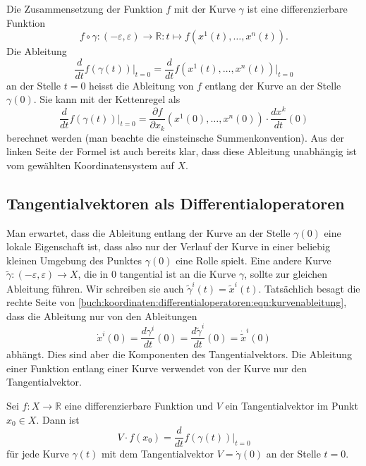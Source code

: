 Die Zusammensetzung der Funktion $f$ mit der Kurve $\gamma$ ist eine
differenzierbare Funktion
\[
f\circ\gamma
\colon
(-\varepsilon,\varepsilon) \to \mathbb{R}
:
t
\mapsto
f(x^1(t),\dots,x^n(t)).
\]
Die Ableitung
\[
\frac{d}{dt} f(\gamma(t))
\bigg|_{t=0}
=
\frac{d}{dt} f(x^1(t),\dots,x^n(t))
\bigg|_{t=0}
\]
an der Stelle $t=0$ heisst die Ableitung von $f$ entlang der Kurve
an der Stelle $\gamma(0)$.
Sie kann mit der Kettenregel als
\begin{equation}
\frac{d}{dt} f(\gamma(t))
\bigg|_{t=0}
=
\frac{\partial f}{\partial x_k}(x^1(0),\dots,x^n(0))
\cdot
\frac{dx^k}{dt}(0)
\label{buch:koordinaten:differentialoperatoren:eqn:kurvenableitung}
\end{equation}
berechnet werden (man beachte die einsteinsche Summenkonvention).
Aus der linken Seite der Formel ist auch bereits klar, dass diese
Ableitung unabhängig ist vom gewählten Koordinatensystem auf $X$.

%
%
\subsection{Tangentialvektoren als Differentialoperatoren}
Man erwartet, dass die Ableitung entlang der Kurve an der Stelle
$\gamma(0)$ eine lokale Eigenschaft ist, dass also nur der Verlauf
der Kurve in einer beliebig kleinen Umgebung des Punktes $\gamma(0)$
eine Rolle spielt.
Eine andere Kurve $\tilde{\gamma}\colon(-\varepsilon,\varepsilon)\to X$,
die in $0$ tangential ist an die Kurve $\gamma$, sollte zur gleichen
Ableitung führen.
Wir schreiben sie auch $\tilde{\gamma}^i(t) = \tilde{x}^i(t)$.
Tatsächlich besagt die rechte Seite von
\eqref{buch:koordinaten:differentialoperatoren:eqn:kurvenableitung},
dass die Ableitung nur von den Ableitungen
\[
\dot{x}^i(0)
=
\frac{d\gamma^i}{dt}(0)
=
\frac{d\tilde{\gamma}^i}{dt}(0)
=
\dot{\tilde{x}}^i(0)
\]
abhängt.
Dies sind aber die Komponenten des Tangentialvektors.
Die Ableitung einer Funktion entlang einer Kurve verwendet von
der Kurve nur den Tangentialvektor.

\begin{definition}
Sei $f\colon X\to\mathbb{R}$ eine differenzierbare Funktion und
$V$ ein Tangentialvektor im Punkt $x_0\in X$.
Dann ist
\[
V\cdot f(x_0)
=
\frac{d}{dt} f(\gamma(t))\bigg|_{t=0}
\]
für jede Kurve $\gamma(t)$ mit dem Tangentialvektor $V=\dot{\gamma}(0)$
an der Stelle $t=0$.
\end{definition}

